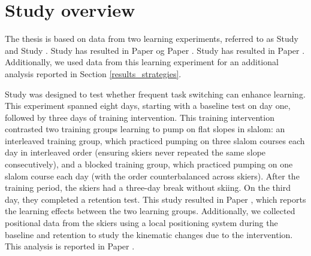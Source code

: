 

\section{Study overview}
The thesis is based on data from two learning experiments, referred to as Study   and Study . Study  has resulted in Paper  og Paper . Study  has resulted in Paper . Additionally, we used data from this learning experiment for an additional analysis reported in Section \ref{results_strategies}.

Study  was designed to test whether frequent task switching can enhance learning. This experiment spanned eight days, starting with a baseline test on day one, followed by three days of training intervention. This training intervention contrasted two training groups learning to pump on flat slopes in slalom: an interleaved training group, which practiced pumping on three slalom courses each day in interleaved order (ensuring skiers never repeated the same slope consecutively), and a blocked training group, which practiced pumping on one slalom course each day (with the order counterbalanced across skiers). After the training period, the skiers had a three-day break without skiing. On the third day, they completed a retention test. This study resulted in Paper , which reports the learning effects between the two learning groups. Additionally, we collected positional data from the skiers using a local positioning system during the baseline and retention to study the kinematic changes due to the intervention. This analysis is reported in Paper . 

